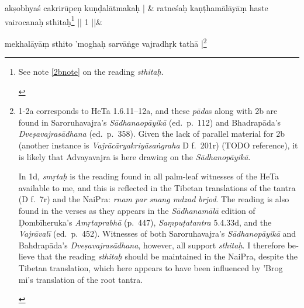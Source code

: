 \documentclass[naipra.tex]{subfiles}
\begin{document}
\begin{sanskrit}


\medskip\versequote
akṣobhyaś cakrirūpeṇ kuṇḍalātmakaḥ | &
ratneśaḥ kaṇṭhamālāyāṃ haste vairocanaḥ sthitaḥ\footnote{\begin{english}
	See note \ref{2bnote} on the reading \emph{sthitaḥ}.
\end{english}} || 1 ||\&


\medskip\versequote
mekhalāyāṃ sthito 'moghaḥ sarvāṅge vajradhṛk tathā |\footnote{\begin{english}
	1-2a corresponds to HeTa 1.6.11–12a, and these \emph{pāda}s along with 2b are found in Saroruhavajra's \emph{Sādhanaopāyikā} (ed.\ p.\ 112) and Bhadrapāda's \emph{Dveṣavajrasādhana} (ed.\ p.\ 358).
	Given the lack of parallel material for 2b (another instance is \emph{Vajrācāryakriyāsaṅgraha} D f.\ 201r) (TODO reference), it is likely that Advayavajra is here drawing on the \emph{Sādhanopāyikā}.
	
	In 1d, \emph{smṛtaḥ} is the reading found in all palm-leaf witnesses of the HeTa available to me, and this is reflected in the Tibetan translations of the tantra (D f.\ 7r) and the NaiPra: \emph{rnam par snang mdzad brjod}.
	The reading is also found in the verses as they appears in the \emph{Sādhanamālā} edition of Ḍombīheruka's \emph{Amṛtaprabhā} (p.\ 447), \emph{Saṃpuṭatantra} 5.4.33d, and the \emph{Vajrāvalī} (ed.\ p.\ 452).
	Witnesses of both Saroruhavajra's \emph{Sādhanopāyikā} and Bahdrapāda's \emph{Dveṣavajrasādhana}, however, all support \emph{sthitaḥ}.
	I therefore believe that the reading \emph{sthitaḥ} should be maintained in the NaiPra, despite the Tibetan translation, which here appears to have been influenced by 'Brog mi's translation of the root tantra.


\end{english}}
\end{sanskrit}
\end{document}
